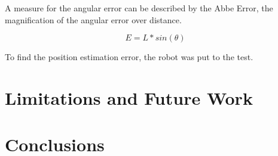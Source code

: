 \documentclass[letterpaper, 10 pt, conference]{ieeeconf}  %
\begin{document}
A measure for the angular error can be described by the Abbe Error, the magnification of the angular error over distance.

\begin{equation}
	E = L * sin(\theta)
\end{equation}

To find the position estimation error, the robot was put to the test.












\section{Limitations and Future Work}





\section{Conclusions}



\addtolength{\textheight}{-12cm}   %
\end{document}
